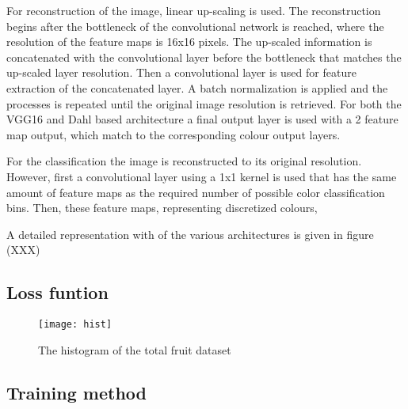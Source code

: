 {For reconstruction of the image, linear up-scaling is used. The reconstruction begins after the bottleneck of the convolutional network is reached, where the resolution of the feature maps is 16x16 pixels. The up-scaled information is concatenated with the convolutional layer before the bottleneck that matches the up-scaled layer resolution. Then a convolutional layer is used for feature extraction of the concatenated layer. A batch normalization is applied and the processes is repeated until the original image resolution is retrieved. For both the VGG16 and Dahl based architecture a final output layer is used with a 2 feature map output, which match to the corresponding colour output layers.

For the classification the image is reconstructed to its original resolution. However, first a convolutional layer using a 1x1 kernel is used that has the same amount of feature maps as the required number of possible color classification bins. Then, these feature maps, representing discretized colours, %


A detailed representation with of the various architectures is given in figure {\color{red}(XXX)}}

\subsection{Loss funtion}

\begin{wrapfigure}{r}{0.5\textwidth}
	\vspace{-20pt}
	\begin{center}
		\texttt{[image: hist]}
	\end{center}
	\caption{\color{red} The histogram of the total fruit dataset}
	\vspace{-10pt}
\end{wrapfigure}

\subsection{Training method}


